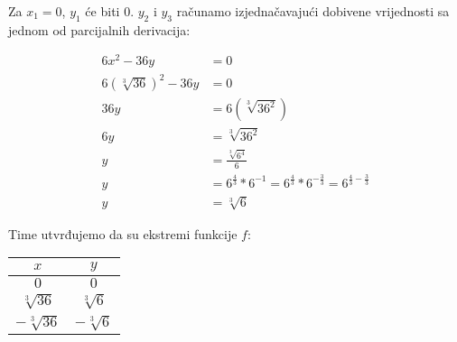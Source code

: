 Za $x_1 = 0$, $y_1$ će biti 0. $y_2$ i $y_3$ računamo izjednačavajući dobivene vrijednosti sa jednom od parcijalnih derivacija:

\begin{align*}
    6x^2 - 36y &= 0\\
    6(\sqrt[3]{36})^2 - 36y &= 0\\
    36y &= 6(\sqrt[3]{36^2})\\
    6y &= \sqrt[3]{36^2} \\
    y &= \frac{\sqrt[3]{6^4}}{6} \\
    y &= 6^{\frac{4}{3}} * 6^{-1} = 6^{\frac{4}{3}} * 6^{-\frac{3}{3}} = 6^{\frac{4}{3} - \frac{3}{3}} \\
    y &= \sqrt[3]6
\end{align*}

Time utvrđujemo da su ekstremi funkcije $f$:

\begin{center}
\begin{tabular}{c | c}
    $x$ & $y$ \\
    \hline
    $0$ & $0$ \\
    $\sqrt[3]{36}$ & $\sqrt[3]6$ \\
    $-\sqrt[3]{36}$ & $-\sqrt[3]6$ \\
\end{tabular}
\end{center}

\newpage